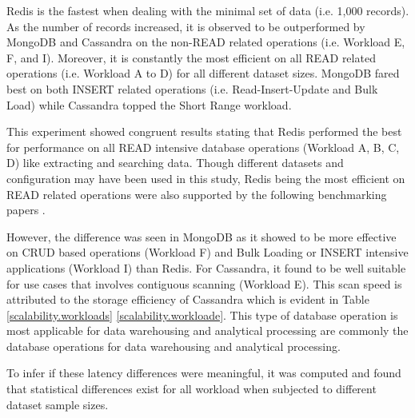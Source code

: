 \documentclass[5p]{elsarticle}
\begin{document}
Redis is the fastest when dealing with the minimal set of data (i.e. 1,000 records). 
As the number of records increased, it is observed to be outperformed by MongoDB and Cassandra on the non-READ related operations (i.e. Workload E, F, and I).  
Moreover, it is constantly the most efficient on all READ related operations (i.e. Workload A to D) for all different dataset sizes. 
MongoDB fared best on both INSERT related operations (i.e. Read-Insert-Update and Bulk Load) while Cassandra topped the Short Range workload. 

This experiment showed congruent results stating that Redis performed the best for performance on all READ intensive database operations (Workload A, B, C, D) like extracting and searching data. 
Though different datasets and configuration may have been used in this study, Redis being the most efficient on READ related operations were also supported by the following benchmarking papers \cite{J.Ellis2018} \cite{Altoros2018}.

However, the difference was seen in MongoDB as it showed to be more effective on CRUD based operations (Workload F) and Bulk Loading or INSERT intensive applications (Workload I) than Redis. 
For Cassandra, it found to be well suitable for use cases that involves contiguous scanning (Workload E). 
This scan speed is attributed to the storage efficiency \cite{E.Chan2016} of Cassandra which is evident in Table \ref{scalability.workloads} \ref{scalability.workloade}. 
This type of database operation is most applicable for data warehousing and analytical processing are commonly the database operations for data warehousing and analytical processing. 

To infer if these latency differences were meaningful, it was computed and found that statistical differences 
exist for all workload when subjected to different dataset sample sizes. 
\end{document}
